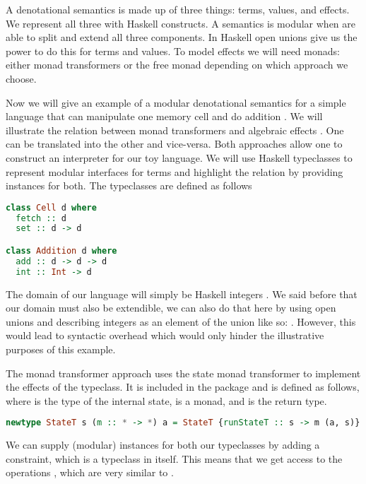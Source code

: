 A denotational semantics is made up of three things: terms, values, and effects. We represent all three with Haskell constructs. A semantics is modular when are able to split and extend all three components. In Haskell open unions give us the power to do this for terms and values. To model effects we will need monads: either monad transformers or the free monad depending on which approach we choose. %

Now we will give an example of a modular denotational semantics for a simple language that can manipulate one memory cell  and do addition . We will illustrate the relation between monad transformers and algebraic effects \cite{DBLP:conf/haskell/SchrijversPWJ19}. One can be translated into the other and vice-versa. Both approaches allow one to construct an interpreter for our toy language. We will use Haskell typeclasses to represent modular interfaces for terms and highlight the relation by providing instances for both. The typeclasses are defined as follows

\begin{lstlisting}[language=Haskell]
class Cell d where
  fetch :: d
  set :: d -> d

class Addition d where
  add :: d -> d -> d
  int :: Int -> d
\end{lstlisting}

The domain of our language will simply be Haskell integers . We said before that our domain must also be extendible, we can also do that here by using open unions and describing integers as an element of the union like so: . However, this would lead to syntactic overhead which would only hinder the illustrative purposes of this example.

The monad transformer approach uses the state monad transformer to implement the effects of the  typeclass. It is included in the  package and is defined as follows, where  is the type of the internal state,  is a monad, and  is the return type.

\begin{lstlisting}[language=Haskell]
newtype StateT s (m :: * -> *) a = StateT {runStateT :: s -> m (a, s)}
\end{lstlisting}

We can supply (modular) instances for both our typeclasses by adding a  constraint, which is a typeclass in itself. This means that we get access to the operations , which are very similar to .

